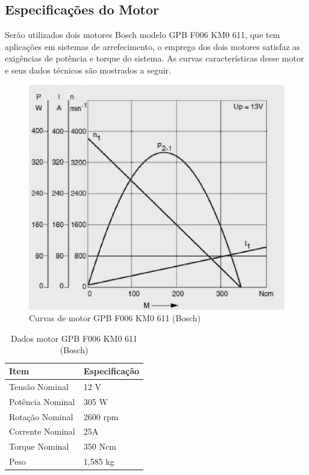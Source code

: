 \subsection{Especificações do Motor}

Serão utilizados dois motores Bosch modelo GPB F006 KM0 611, que tem aplicações
em sistemas de arrefecimento, o emprego dos dois motores satisfaz as exigências
de potência e torque do sistema. As curvas características desse motor e seus
dados técnicos são mostrados a seguir.

\begin{figure}[H]
  \centering
    \includegraphics[width=\textwidth]{figuras/motor.eps}
  \caption{Curvas de motor GPB F006 KM0 611 (Bosch)}
  \label{fig:motor}
\end{figure}

\begin{table}[h]
\centering
\vspace{0.5cm}
\begin{tabular}{|l|l|}
\hline
Item                & Especificação \\
\hline
Tensão Nominal      & 12 V \\
Potência Nominal    & 305 W \\
Rotação Nominal     & 2600 rpm \\
Corrente Nominal    & 25A \\
Torque Nominal      & 350 Ncm \\
Peso                & 1,585 kg \\
\hline
\end{tabular}
\caption{Dados motor GPB F006 KM0 611 (Bosch)}
\label{tab:dadosmotor}
\end{table}

